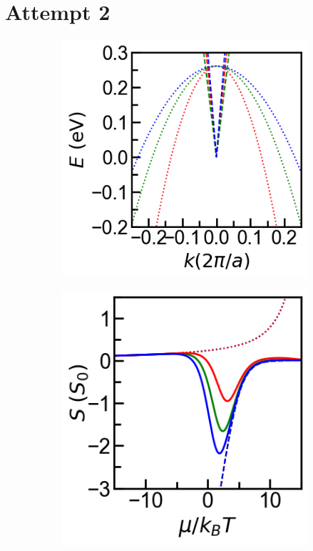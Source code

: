 \section{Attempt 2}

\begin{figure}[ht]

    \centering
    \begin{subfigure}{0.33\textwidth}
      \includegraphics[width=\textwidth]{../Fig2BM-typeI.png}
      \caption{}
    \end{subfigure}
    \hfil
    \begin{subfigure}{0.33\textwidth}
      \includegraphics[width=\textwidth]{../Seebeck.png}

\end{subfigure}
\end{figure}
